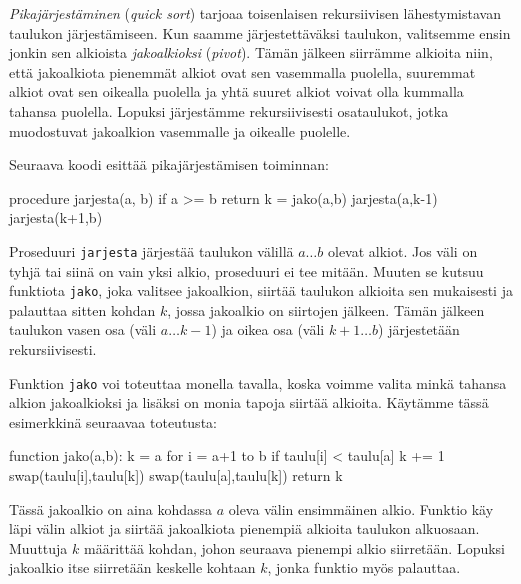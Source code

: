 \emph{Pikajärjestäminen} (\emph{quick sort}) tarjoaa toisenlaisen rekursiivisen
lähestymis\-tavan taulukon järjestämiseen.
Kun saamme järjestettäväksi taulukon, valitsemme ensin jonkin
sen alkioista \emph{jakoalkioksi} (\emph{pivot}).
Tämän jälkeen siirräm\-me alkioita niin,
että jakoalkiota pienemmät alkiot ovat sen vasemmalla puolella,
suuremmat alkiot ovat sen oikealla puolella ja
yhtä suuret alkiot voivat olla kummalla tahansa puolella.
Lopuksi järjestämme rekursiivisesti osataulukot,
jotka muodostuvat jakoalkion vasemmalle ja oikealle puolelle.

Seuraava koodi esittää pikajärjestämisen toiminnan:

\begin{code}
procedure jarjesta(a, b)
    if a >= b
        return
    k = jako(a,b)
    jarjesta(a,k-1)
    jarjesta(k+1,b)
\end{code}

Proseduuri \texttt{jarjesta} järjestää taulukon välillä
$a \dots b$ olevat alkiot.
Jos väli on tyhjä tai siinä on vain yksi alkio,
proseduuri ei tee mitään.
Muuten se kutsuu funktiota \texttt{jako}, joka valitsee jakoalkion,
siirtää taulukon alkioita sen mukaisesti
ja palauttaa sitten kohdan $k$,
jossa jakoalkio on siirtojen jälkeen.
Tämän jälkeen taulukon vasen osa (väli $a \dots k-1$)
ja oikea osa (väli $k+1 \dots b$) järjestetään rekursiivisesti.

Funktion \texttt{jako} voi toteuttaa monella tavalla,
koska voimme valita minkä tahansa alkion jakoalkioksi ja
lisäksi on monia tapoja siirtää alkioita.
Käy\-tämme tässä esimerkkinä seuraavaa toteutusta:

\begin{code}
function jako(a,b):
    k = a
    for i = a+1 to b
        if taulu[i] < taulu[a]
            k += 1
            swap(taulu[i],taulu[k])
    swap(taulu[a],taulu[k])
    return k
\end{code}

Tässä jakoalkio on aina kohdassa $a$ oleva välin ensimmäinen alkio.
Funktio käy läpi välin alkiot ja siirtää
jakoalkiota pienempiä alkioita taulukon alkuosaan.
Muuttuja $k$ määrittää kohdan,
johon seuraava pienempi alkio siirretään.
Lopuksi jakoalkio itse siirretään keskelle
kohtaan $k$, jonka funktio myös palauttaa.

